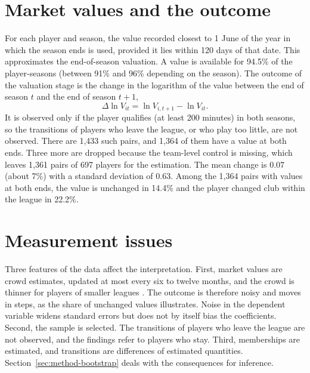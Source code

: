 \section{Market values and the outcome}
\label{sec:data-values}

For each player and season, the value recorded closest to 1 June of the year in which the season ends is used, provided it lies within 120 days of that date. This approximates the end-of-season valuation. A value is available for 94.5\% of the player-seasons (between 91\% and 96\% depending on the season). The outcome of the valuation stage is the change in the logarithm of the value between the end of season $t$ and the end of season $t+1$,
\begin{equation}
	\Delta\ln V_{it}=\ln V_{i,t+1}-\ln V_{it}.
\end{equation}
It is observed only if the player qualifies (at least 200 minutes) in both seasons, so the transitions of players who leave the league, or who play too little, are not observed. There are 1,433 such pairs, and 1,364 of them have a value at both ends. Three more are dropped because the team-level control is missing, which leaves 1,361 pairs of 697 players for the estimation. The mean change is $0.07$ (about 7\%) with a standard deviation of $0.63$. Among the 1,364 pairs with values at both ends, the value is unchanged in 14.4\% and the player changed club within the league in 22.2\%.

\section{Measurement issues}
\label{sec:data-measurement}

Three features of the data affect the interpretation. First, market values are crowd estimates, updated at most every six to twelve months, and the crowd is thinner for players of smaller leagues \cite{muller2017beyond}. The outcome is therefore noisy and moves in steps, as the share of unchanged values illustrates. Noise in the dependent variable widens standard errors but does not by itself bias the coefficients. Second, the sample is selected. The transitions of players who leave the league are not observed, and the findings refer to players who stay. Third, memberships are estimated, and transitions are differences of estimated quantities. Section~\ref{sec:method-bootstrap} deals with the consequences for inference.
